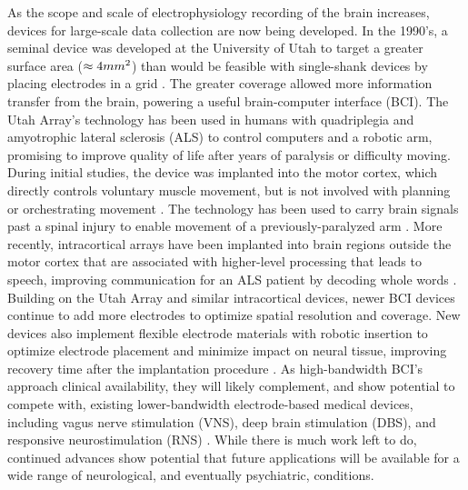 \documentclass[11pt]{article}
\begin{document}
As the scope and scale of electrophysiology recording of the brain increases, devices for large-scale data collection are now being developed. In the 1990's, a seminal device was developed at the University of Utah to target a greater surface area ($\approx4mm\textsuperscript{2}$) than would be feasible with single-shank devices by placing electrodes in a grid \cite{maynard1997utaharray}. The greater coverage allowed more information transfer from the brain, powering a useful brain-computer interface (BCI). The Utah Array's technology has been used in humans with quadriplegia and amyotrophic lateral sclerosis (ALS) to control computers and a robotic arm, promising to improve quality of life after years of paralysis or difficulty moving. During initial studies, the device was implanted into the motor cortex, which directly controls voluntary muscle movement, but is not involved with planning or orchestrating movement \cite{kim2008braingate, simeral2011braingate, hochberg2012reach, bacher2015bg}. The technology has been used to carry brain signals past a spinal injury to enable movement of a previously-paralyzed arm \cite{ajiboye2017bciarm}. More recently, intracortical arrays have been implanted into brain regions outside the motor cortex that are associated with higher-level processing that leads to speech, improving communication for an ALS patient by decoding whole words \cite{card2024neuroprosthesis}. Building on the Utah Array and similar intracortical devices, newer BCI devices continue to add more electrodes to optimize spatial resolution and coverage. New devices also implement flexible electrode materials with robotic insertion to optimize electrode placement and minimize impact on neural tissue, improving recovery time after the implantation procedure \cite{musk2019integrated}. As high-bandwidth BCI's approach clinical availability, they will likely complement, and show potential to compete with, existing lower-bandwidth electrode-based medical devices, including vagus nerve stimulation (VNS), deep brain stimulation (DBS), and responsive neurostimulation (RNS) \cite{pertsch2025neuromod, heck2014rns, geller2018rns}. While there is much work left to do, continued advances show potential that future applications will be available for a wide range of neurological, and eventually psychiatric, conditions.
\end{document}
